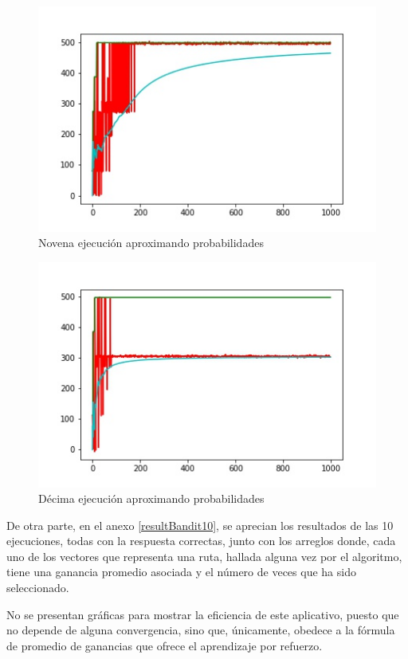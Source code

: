 \begin{figure}
  \centering
    \includegraphics[scale=0.9]{grafi9.jpg}
  \caption[Novena ejecución]{Novena ejecución aproximando probabilidades}
  \label{graf9}
\end{figure}
\begin{figure}
  \centering
    \includegraphics[scale=0.9]{grafi10.jpg}
  \caption[Décima ejecución]{Décima ejecución aproximando probabilidades}
  \label{graf10}
\end{figure}

De otra parte, en el anexo \ref{resultBandit10}, se aprecian los resultados de las 10 ejecuciones, todas con la respuesta correctas, junto con los arreglos donde, cada uno de los vectores que representa una ruta, hallada alguna vez por el algoritmo, tiene una ganancia promedio asociada y el número de veces que ha sido seleccionado.

No se presentan gráficas para mostrar la eficiencia de este aplicativo, puesto que no depende de alguna convergencia, sino que, únicamente, obedece a la fórmula de promedio de ganancias que ofrece el aprendizaje por refuerzo.
